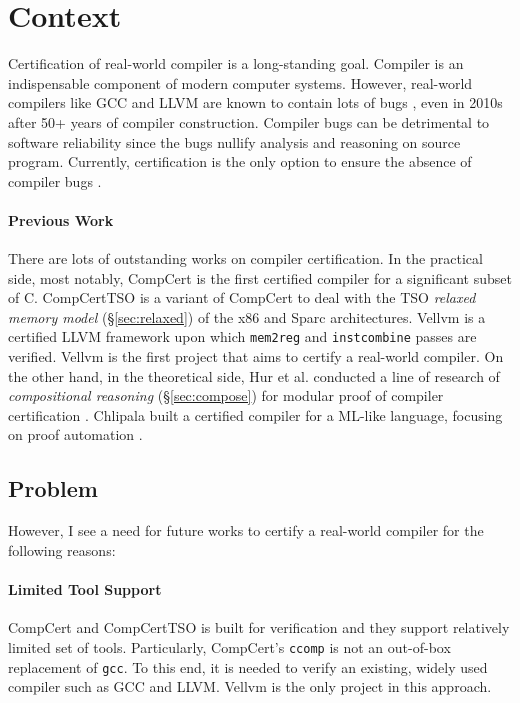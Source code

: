 \documentclass[nocopyrightspace]{sigplanconf}
\begin{document}
\section{Context}
Certification of real-world compiler is a long-standing goal.
Compiler is an indispensable component of modern computer systems.
However, real-world compilers like GCC and LLVM are known to contain
lots of bugs \cite{TODO}, even in 2010s after 50+ years of compiler
construction.  Compiler bugs can be detrimental to software
reliability since the bugs nullify analysis and reasoning on source
program.  Currently, certification is the only option to ensure the
absence of compiler bugs \cite{TODO}.

\paragraph{Previous Work}
There are lots of outstanding works on compiler certification.  In the
practical side, most notably, CompCert \cite{TODO} is the first
certified compiler for a significant subset of C.  CompCertTSO
\cite{TODO} is a variant of CompCert to deal with the TSO
\emph{relaxed memory model} (\S\ref{sec:relaxed}) of the x86 and Sparc
architectures.  Vellvm \cite{TODO} is a certified LLVM framework upon
which \texttt{mem2reg} \cite{TODO} and \texttt{instcombine}
\cite{TODO} passes are verified.  Vellvm is the first project that
aims to certify a real-world compiler.  On the other hand, in the
theoretical side, Hur et al. conducted a line of research of
\emph{compositional reasoning} (\S\ref{sec:compose}) for modular proof
of compiler certification \cite{TODO}.  Chlipala built a certified
compiler for a ML-like language, focusing on proof automation
\cite{TODO}.

\subsection{Problem}
However, I see a need for future works to certify a real-world
compiler for the following reasons:

\paragraph{Limited Tool Support} 
CompCert and CompCertTSO is built for verification and they support
relatively limited set of tools.  Particularly, CompCert's
\texttt{ccomp} is not an out-of-box replacement of \texttt{gcc}.  To
this end, it is needed to verify an existing, widely used compiler
such as GCC and LLVM.  Vellvm is the only project in this approach.
\end{document}

